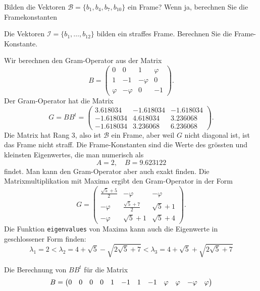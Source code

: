 \begin{teilaufgaben}
\item
Bilden die Vektoren $\mathcal{B}=\{b_1,b_4,b_7,b_{10}\}$ ein Frame?
Wenn ja, berechnen Sie die Framekonstanten
\item
Die Vektoren $\mathcal{I}=\{b_1,\dots,b_{12}\}$ bilden ein straffes
Frame.
Berechnen Sie die Frame-Konstante.
\end{teilaufgaben}

\begin{loesung}
\begin{teilaufgaben}
\item
Wir berechnen den Gram-Operator aus der Matrix
\[
B=\begin{pmatrix}
      0&       0&       1& \varphi\\
      1&-      1&-\varphi&       0\\
\varphi&-\varphi&       0&-      1
\end{pmatrix}.
\]
Der Gram-Operator hat die Matrix
\[
G
=
BB^t
=
\begin{pmatrix}
   3.618034& -1.618034&-1.618034\\
  -1.618034&  4.618034& 3.236068\\
  -1.618034&  3.236068& 6.236068
\end{pmatrix}.
\]
Die Matrix hat Rang $3$, also ist $\mathcal{B}$ ein Frame, aber
weil $G$ nicht diagonal ist, ist das Frame nicht straff.
Die Frame-Konstanten sind die Werte des grössten und kleinsten Eigenwertes,
die man numerisch als
\[
A=2,\quad B=9.623122
\]
findet.
Man kann den Gram-Operator aber auch exakt finden.
Die Matrixmultiplikation mit Maxima ergibt den Gram-Operator in der
Form
\[
G=\begin{pmatrix}
\frac{\sqrt{5}+5}2 & -\varphi           & -\varphi    \\
-\varphi           & \frac{\sqrt{5}+7}2 & \sqrt{5} + 1\\
-\varphi           & \sqrt{5}+1         & \sqrt{5} + 4
\end{pmatrix}.
\]
Die Funktion \texttt{eigenvalues} von Maxima kann auch die Eigenwerte
in geschlossener Form finden:
\[
\lambda_1
=
2
<
\lambda_2
=
4+\sqrt{5} - \sqrt{2\sqrt{5}+7}
<
\lambda_3
=
4+\sqrt{5} + \sqrt{2\sqrt{5}+7}
\]
\item
Die Berechnung von $BB^t$ für die Matrix
\[
\setcounter{MaxMatrixCols}{12}
B=\begin{pmatrix}
      0&      0&       0&      0&
      1&     -1&       1&     -1&
\varphi&\varphi&-\varphi&\varphi
\\

\end{pmatrix}\]
\end{teilaufgaben}
\end{loesung}
